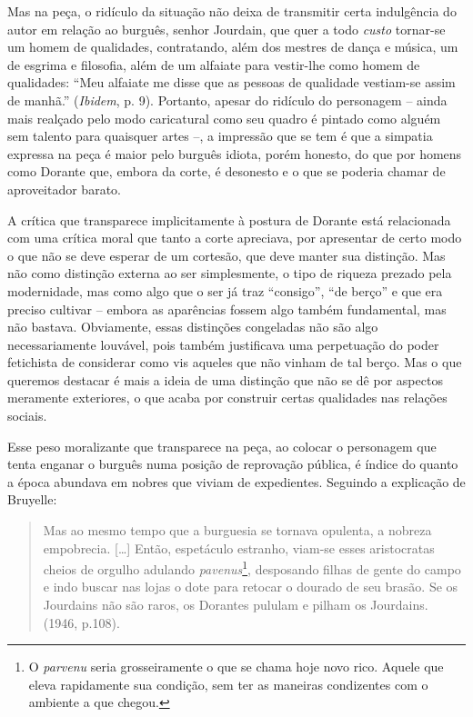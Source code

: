 Mas na peça, o ridículo da situação não deixa de transmitir certa
indulgência do autor em relação ao burguês, senhor Jourdain, que quer a
todo \emph{custo} tornar-se um homem de qualidades, contratando, além
dos mestres de dança e música, um de esgrima e filosofia, além de um
alfaiate para vestir-lhe como homem de qualidades: ``Meu alfaiate me
disse que as pessoas de qualidade vestiam-se assim de manhã.''
(\emph{Ibidem}, p. 9). Portanto, apesar do ridículo do personagem --
ainda mais realçado pelo modo caricatural como seu quadro é pintado como
alguém sem talento para quaisquer artes --, a impressão que se tem é que
a simpatia expressa na peça é maior pelo burguês idiota, porém honesto,
do que por homens como Dorante que, embora da corte, é desonesto e o que
se poderia chamar de aproveitador barato.

A crítica que transparece implicitamente à postura de Dorante está
relacionada com uma crítica moral que tanto a corte apreciava, por
apresentar de certo modo o que não se deve esperar de um cortesão, que
deve manter sua distinção. Mas não como distinção externa ao ser
simplesmente, o tipo de riqueza prezado pela modernidade, mas como algo
que o ser já traz ``consigo'', ``de berço'' e que era preciso cultivar
-- embora as aparências fossem algo também fundamental, mas não bastava.
Obviamente, essas distinções congeladas não são algo necessariamente
louvável, pois também justificava uma perpetuação do poder fetichista de
considerar como vis aqueles que não vinham de tal berço. Mas o que
queremos destacar é mais a ideia de uma distinção que não se dê por
aspectos meramente exteriores, o que acaba por construir certas
qualidades nas relações sociais.

Esse peso moralizante que transparece na peça, ao colocar o personagem
que tenta enganar o burguês numa posição de reprovação pública, é índice
do quanto a época abundava em nobres que viviam de expedientes. Seguindo
a explicação de Bruyelle:

\begin{quote}
Mas ao mesmo tempo que a burguesia se tornava opulenta, a nobreza
empobrecia. {[}\ldots{}{]} Então, espetáculo estranho, viam-se esses
aristocratas cheios de orgulho adulando \emph{pavenus}\footnote{O
  \emph{parvenu} seria grosseiramente o que se chama hoje novo rico.
  Aquele que eleva rapidamente sua condição, sem ter as maneiras
  condizentes com o ambiente a que chegou.}, desposando filhas de gente
do campo e indo buscar nas lojas o dote para retocar o dourado de seu
brasão. Se os Jourdains não são raros, os Dorantes pululam e pilham os
Jourdains. (1946, p.108).
\end{quote}

